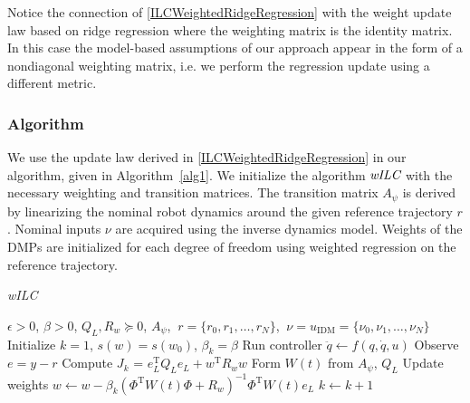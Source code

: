\documentclass[10pt,a4paper]{article}
\newcommand{\joint}{q} %
\newcommand{\state}{y} %
\newcommand{\dmp}{s} %
\newcommand{\error}{e} %
\newcommand{\traj}{r} %
\newcommand{\sysInput}{u} %
\newcommand{\fullvec}{\psi} %
\newcommand{\weights}{w} %
\newcommand{\dynamics}{f}
\newcommand{\ValueFunction}{J}
\newcommand{\threshold}{\epsilon}
\newcommand{\alg}{\emph{wILC}}
\begin{document}
Notice the connection of \eqref{ILCWeightedRidgeRegression} with the weight update law based on ridge regression where the weighting matrix is the identity matrix. In this case the model-based assumptions of our approach appear in the form of a nondiagonal weighting matrix, i.e. we perform the regression update using a different metric.

\subsubsection{Algorithm}

We use the update law derived in \eqref{ILCWeightedRidgeRegression} in our algorithm, given in Algorithm~\ref{alg1}. We initialize the algorithm $\alg$ with the necessary weighting and transition matrices. The transition matrix $A_{\fullvec}$ is derived by linearizing the nominal robot dynamics around the given reference trajectory $r$. Nominal inputs $\nu$ are acquired using the inverse dynamics model. Weights of the DMPs are initialized for each degree of freedom using weighted regression on the reference trajectory.


\begin{algorithm}[tb]
   \caption{\alg}
   \label{alg1}
\begin{algorithmic}
    $\threshold > 0$, $\beta > 0$, $Q_L, R_{\weights} \succeq 0$, $A_{\fullvec}$, $\ \traj = \{\traj_0, \traj_1, \ldots, \traj_N \}$, $\ \nu = \sysInput_{\mathrm{IDM}} = \{\nu_0, \nu_1, \ldots, \nu_N \}$
   \STATE Initialize $k = 1$, $\dmp(\weights) = \dmp(\weights_0)$, $\beta_k = \beta$
   \REPEAT 
 	   \STATE Run controller $\ddot{\joint} \leftarrow \dynamics(\joint,\dot{\joint},\sysInput)$ %
 	   \STATE Observe $\error = \state - \traj$
 	   \STATE Compute $\ValueFunction_k$ = $\error_L^{\mathrm{T}}Q_L\error_L + \weights^{\mathrm{T}}R_w\weights$
 	   \STATE Form $W(t)$ from $A_{\fullvec}$, $Q_L$
 	   \STATE Update weights $\weights \leftarrow \weights - \beta_k(\Phi^{\mathrm{T}}W(t)\Phi + R_{\weights})^{-1}\Phi^{\mathrm{T}}W(t)\error_L$
 	   \STATE $k \leftarrow k + 1$
   \UNTIL{$\ValueFunction_k < \threshold$}
\end{algorithmic}
\end{algorithm}
\end{document}
